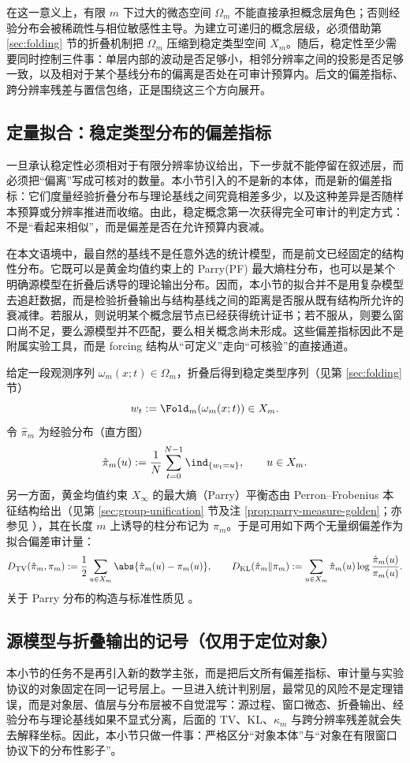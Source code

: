 在这一意义上，有限 \(m\) 下过大的微态空间 \(\Omega_m\) 不能直接承担概念层角色；否则经验分布会被稀疏性与相位敏感性主导。为建立可递归的概念层级，必须借助第 \ref{sec:folding} 节的折叠机制把 \(\Omega_m\) 压缩到稳定类型空间 \(X_m\)。随后，稳定性至少需要同时控制三件事：单层内部的波动是否足够小，相邻分辨率之间的投影是否足够一致，以及相对于某个基线分布的偏离是否处在可审计预算内。后文的偏差指标、跨分辨率残差与置信包络，正是围绕这三个方向展开。

\subsection{定量拟合：稳定类型分布的偏差指标}\label{sec:quant-fit}
一旦承认稳定性必须相对于有限分辨率协议给出，下一步就不能停留在叙述层，而必须把“偏离”写成可核对的数量。本小节引入的不是新的本体，而是新的偏差指标：它们度量经验折叠分布与理论基线之间究竟相差多少，以及这种差异是否随样本预算或分辨率推进而收缩。由此，稳定概念第一次获得完全可审计的判定方式：不是“看起来相似”，而是偏差是否在允许预算内衰减。

在本文语境中，最自然的基线不是任意外选的统计模型，而是前文已经固定的结构性分布。它既可以是黄金均值约束上的 Parry(PF) 最大熵柱分布，也可以是某个明确源模型在折叠后诱导的理论输出分布。因而，本小节的拟合并不是用复杂模型去追赶数据，而是检验折叠输出与结构基线之间的距离是否服从既有结构所允许的衰减律。若服从，则说明某个概念层节点已经获得统计证书；若不服从，则要么窗口尚不足，要么源模型并不匹配，要么相关概念尚未形成。这些偏差指标因此不是附属实验工具，而是 forcing 结构从“可定义”走向“可核验”的直接通道。

给定一段观测序列 $\omega_m(x;t)\in\Omega_m$，折叠后得到稳定类型序列（见第 \ref{sec:folding} 节）
\[
w_t:=\Fold_m(\omega_m(x;t))\in X_m.
\]
令 $\hat{\pi}_m$ 为经验分布（直方图）
\[
\hat{\pi}_m(u):=\frac{1}{N}\sum_{t=0}^{N-1}\ind_{\{w_t=u\}},\qquad u\in X_m.
\]
另一方面，黄金均值约束 $X_\infty$ 的最大熵（Parry）平衡态由 Perron--Frobenius 本征结构给出（见第 \ref{sec:group-unification} 节及注 \ref{prop:parry-measure-golden}；亦参见 \cite{LindMarcus1995}），其在长度 $m$ 上诱导的柱分布记为 $\pi_m$。于是可用如下两个无量纲偏差作为拟合偏差审计量：
\[
D_{\mathrm{TV}}(\hat{\pi}_m,\pi_m):=\frac12\sum_{u\in X_m}\abs{\hat{\pi}_m(u)-\pi_m(u)},\qquad
D_{\mathrm{KL}}(\hat{\pi}_m\|\pi_m):=\sum_{u\in X_m}\hat{\pi}_m(u)\log\frac{\hat{\pi}_m(u)}{\pi_m(u)}.
\]
关于 Parry 分布的构造与标准性质见 \cite{LindMarcus1995}。

\subsection{源模型与折叠输出的记号（仅用于定位对象）}\label{subsec:histogram-convergence-natural-sources}
本小节的任务不是再引入新的数学主张，而是把后文所有偏差指标、审计量与实验协议的对象固定在同一记号层上。一旦进入统计判别层，最常见的风险不是定理错误，而是对象层、值层与分布层被不自觉混写：源过程、窗口微态、折叠输出、经验分布与理论基线如果不显式分离，后面的 TV、KL、\(\kappa_m\) 与跨分辨率残差就会失去解释坐标。因此，本小节只做一件事：严格区分“对象本体”与“对象在有限窗口协议下的分布性影子”。

